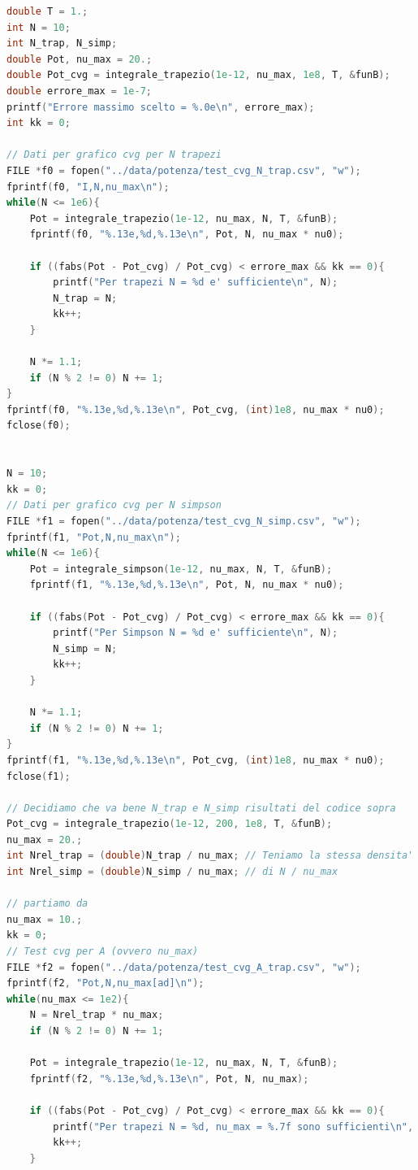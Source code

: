 \documentclass[a4paper, titlepage]{article}
\begin{document}
\begin{lstlisting}[language=C]
double T = 1.;
int N = 10;
int N_trap, N_simp;
double Pot, nu_max = 20.;
double Pot_cvg = integrale_trapezio(1e-12, nu_max, 1e8, T, &funB);
double errore_max = 1e-7;
printf("Errore massimo scelto = %.0e\n", errore_max);
int kk = 0;

// Dati per grafico cvg per N trapezi
FILE *f0 = fopen("../data/potenza/test_cvg_N_trap.csv", "w");
fprintf(f0, "I,N,nu_max\n");
while(N <= 1e6){
    Pot = integrale_trapezio(1e-12, nu_max, N, T, &funB);
    fprintf(f0, "%.13e,%d,%.13e\n", Pot, N, nu_max * nu0);

    if ((fabs(Pot - Pot_cvg) / Pot_cvg) < errore_max && kk == 0){
        printf("Per trapezi N = %d e' sufficiente\n", N);
        N_trap = N;
        kk++;
    }

    N *= 1.1;
    if (N % 2 != 0) N += 1;
}
fprintf(f0, "%.13e,%d,%.13e\n", Pot_cvg, (int)1e8, nu_max * nu0);
fclose(f0);


N = 10;
kk = 0;
// Dati per grafico cvg per N simpson
FILE *f1 = fopen("../data/potenza/test_cvg_N_simp.csv", "w");
fprintf(f1, "Pot,N,nu_max\n");
while(N <= 1e6){
    Pot = integrale_simpson(1e-12, nu_max, N, T, &funB);
    fprintf(f1, "%.13e,%d,%.13e\n", Pot, N, nu_max * nu0);

    if ((fabs(Pot - Pot_cvg) / Pot_cvg) < errore_max && kk == 0){
        printf("Per Simpson N = %d e' sufficiente\n", N);
        N_simp = N;
        kk++;
    }

    N *= 1.1;
    if (N % 2 != 0) N += 1;
}
fprintf(f1, "%.13e,%d,%.13e\n", Pot_cvg, (int)1e8, nu_max * nu0);
fclose(f1);

// Decidiamo che va bene N_trap e N_simp risultati del codice sopra
Pot_cvg = integrale_trapezio(1e-12, 200, 1e8, T, &funB);
nu_max = 20.;
int Nrel_trap = (double)N_trap / nu_max; // Teniamo la stessa densita'
int Nrel_simp = (double)N_simp / nu_max; // di N / nu_max

// partiamo da
nu_max = 10.;
kk = 0;
// Test cvg per A (ovvero nu_max)
FILE *f2 = fopen("../data/potenza/test_cvg_A_trap.csv", "w");
fprintf(f2, "Pot,N,nu_max[ad]\n");
while(nu_max <= 1e2){
    N = Nrel_trap * nu_max;
    if (N % 2 != 0) N += 1;

    Pot = integrale_trapezio(1e-12, nu_max, N, T, &funB);
    fprintf(f2, "%.13e,%d,%.13e\n", Pot, N, nu_max);

    if ((fabs(Pot - Pot_cvg) / Pot_cvg) < errore_max && kk == 0){
        printf("Per trapezi N = %d, nu_max = %.7f sono sufficienti\n", N, nu_max);
        kk++;
    }


\end{lstlisting}
\end{document}

